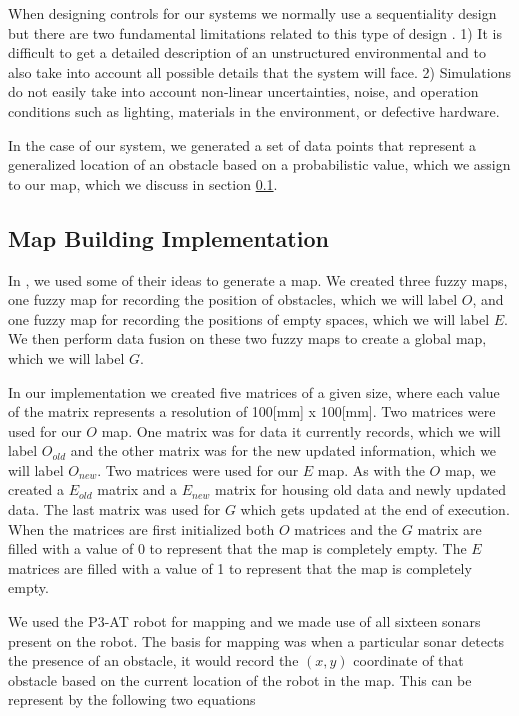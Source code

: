 \documentclass[12pt]{article}
\begin{document}
When designing controls for our systems we normally use a sequentiality design but there are two fundamental limitations related to this type of design \cite{Fuzzy1}. 1) It is difficult to get a detailed description of an unstructured environmental and to also take into account all possible details that the system will face. 2) Simulations do not easily take into account non-linear uncertainties, noise, and operation conditions such as lighting, materials in the environment, or defective hardware. 

In the case of our system, we generated a set of data points that represent a generalized location of an obstacle based on a probabilistic value, which we assign to our map, which we discuss in section \ref{sec:mapbuilding}.



\subsection{Map Building Implementation} \label{sec:mapbuilding}
In \cite{FuzzyMaps}, we used some of their ideas to generate a map. We created three fuzzy maps, one fuzzy map for recording the position of obstacles, which we will label $O$, and one fuzzy map for recording the positions of empty spaces, which we will label $E$. We then perform data fusion on these two fuzzy maps to create a global map, which we will label $G$.

In our implementation we created five matrices of a given size, where each value of the matrix represents a resolution of 100[mm] x 100[mm]. Two matrices were used for our $O$ map. One matrix was for data it currently records, which we will label $O_{old}$ and the other matrix was for the new updated information, which we will label $O_{new}$. Two matrices were used for our $E$ map. As with the $O$ map, we created a $E_{old}$ matrix and a $E_{new}$ matrix for housing old data and newly updated data. The last matrix was used for $G$ which gets updated at the end of execution. When the matrices are first initialized both $O$ matrices and the $G$ matrix are filled with a value of 0 to represent that the map is completely empty. The $E$ matrices are filled with a value of 1 to represent that the map is completely empty.

We used the P3-AT robot for mapping and we made use of all sixteen sonars present on the robot. The basis for mapping was when a particular sonar detects the presence of an obstacle, it would record the $(x,y)$ coordinate of that obstacle based on the current location of the robot in the map. This can be represent by the following two equations
\end{document}

